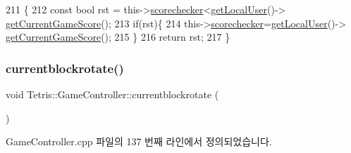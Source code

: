 \begin{DoxyCode}
211                                        \{
212             \textcolor{keyword}{const} \textcolor{keywordtype}{bool} rst = this->\hyperlink{class_tetris_1_1_game_controller_a2982c5246ef73b6c9affa6d25d575982}{scorechecker}<\hyperlink{class_tetris_1_1_game_controller_abc67d4b309ce2886b43a3b4e0af22abc}{getLocalUser}()->
      \hyperlink{class_tetris_1_1_users_1_1_game_user_a93bde8123ee0dc9333d62a44b904023c}{getCurrentGameScore}();
213             \textcolor{keywordflow}{if}(rst)\{
214                 this->\hyperlink{class_tetris_1_1_game_controller_a2982c5246ef73b6c9affa6d25d575982}{scorechecker}=\hyperlink{class_tetris_1_1_game_controller_abc67d4b309ce2886b43a3b4e0af22abc}{getLocalUser}()->
      \hyperlink{class_tetris_1_1_users_1_1_game_user_a93bde8123ee0dc9333d62a44b904023c}{getCurrentGameScore}();
215             \}
216             \textcolor{keywordflow}{return} rst;
217         \}
\end{DoxyCode}
\mbox{\label{class_tetris_1_1_game_controller_a5d93facb945f87ba33fb8be74df023fa}} 
\subsubsection{\texorpdfstring{currentblockrotate()}{currentblockrotate()}\hspace{0.1cm}{\footnotesize\ttfamily [1/2]}}
{\footnotesize\ttfamily void Tetris\+::\+Game\+Controller\+::currentblockrotate (\begin{DoxyParamCaption}{ }\end{DoxyParamCaption})}



Game\+Controller.\+cpp 파일의 137 번째 라인에서 정의되었습니다.


